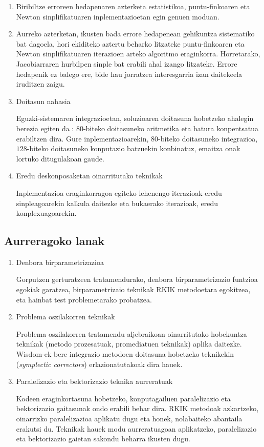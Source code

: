 \begin{enumerate}
\item Biribiltze erroreen hedapenaren azterketa estatistikoa, puntu-finkoaren eta Newton sinplifikatuaren inplementazioetan egin genuen moduan.


\item Aurreko azterketan, ikusten bada errore hedapenean gehikuntza sistematiko bat dagoela, hori ekiditeko aztertu beharko litzateke puntu-finkoaren eta Newton sinplifikatuaren iterazioen arteko algoritmo eraginkorra. Horretarako,  Jacobiarraren hurbilpen sinple bat erabili ahal izango litzateke. Errore hedapenik ez balego ere, bide hau jorratzea interesgarria izan daitekeela iruditzen zaigu.

\item Doitasun nahasia

Eguzki-sistemaren integrazioetan, soluzioaren doitasuna hobetzeko ahalegin berezia egiten da \cite{Laskar2015}: $80$-biteko doitasuneko aritmetika eta batura konpentsatua erabiltzen dira. Gure inplementazioarekin, $80$-biteko doitasuneko integrazioa, $128$-biteko doitasuneko konputazio batzuekin konbinatuz, emaitza onak lortuko ditugulakoan gaude.

\item Eredu deskonposaketan oinarritutako teknikak

Inplementazioa eraginkorragoa egiteko lehenengo iterazioak eredu sinpleagoarekin kalkula daitezke eta bukaerako iterazioak, eredu konplexuagoarekin.

\end{enumerate}


\subsection*{Aurreragoko lanak}


\begin{enumerate}


\item Denbora birparametrizazioa

Gorputzen gerturatzeen tratamendurako, denbora birparametrizazio funtzioa egokiak garatzea, birparametrizaio teknikak RKIK metodoetara egokitzea, eta hainbat test problemetarako probatzea.

\item Problema oszilakorren teknikak

Problema oszilakorren tratamendu aljebraikoan oinarritutako hobekuntza teknikak (metodo prozesatuak, promediatuen teknikak) aplika daitezke.
Wisdom-ek \cite{Wisdom2006} bere integrazio metodoen doitasuna hobetzeko teknikekin (\emph{symplectic correctors}) erlazionatutakoak dira hauek.


\item Paralelizazio eta bektorizazio teknika aurreratuak

Kodeen eraginkortasuna hobetzeko, konputagailuen paralelizazio eta bektorizazio gaitasunak ondo erabili behar dira. RKIK metodoak azkartzeko, oinarrizko paralelizazioa aplikatu dugu eta honek, nolabaiteko abantaila erakutsi du. Teknikak hauek modu aurreratuagoan aplikatzeko,  paralelizazio eta bektorizazio gaietan sakondu beharra ikusten dugu.


\end{enumerate}